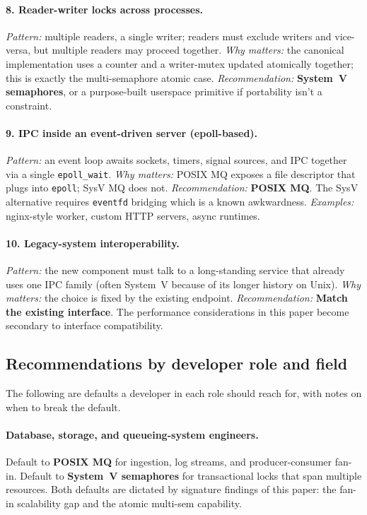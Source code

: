 \documentclass[a4paper,11pt]{article}
\begin{document}
\paragraph{8. Reader-writer locks across processes.}
\textit{Pattern:} multiple readers, a single writer; readers must
exclude writers and vice-versa, but multiple readers may proceed
together.\quad
\textit{Why matters:} the canonical implementation uses a counter
and a writer-mutex updated atomically together; this is exactly the
multi-semaphore atomic case.\quad
\textit{Recommendation:} \textbf{System~V semaphores}, or a
purpose-built userspace primitive if portability isn't a constraint.

\paragraph{9. IPC inside an event-driven server (epoll-based).}
\textit{Pattern:} an event loop awaits sockets, timers, signal
sources, and IPC together via a single \texttt{epoll\_wait}.\quad
\textit{Why matters:} POSIX MQ exposes a file descriptor that
plugs into \texttt{epoll}; SysV MQ does not.\quad
\textit{Recommendation:} \textbf{POSIX MQ}. The SysV alternative
requires \texttt{eventfd} bridging which is a known awkwardness.\quad
\textit{Examples:} nginx-style worker, custom HTTP servers, async
runtimes.

\paragraph{10. Legacy-system interoperability.}
\textit{Pattern:} the new component must talk to a long-standing
service that already uses one IPC family (often System~V because of
its longer history on Unix).\quad
\textit{Why matters:} the choice is fixed by the existing endpoint.\quad
\textit{Recommendation:} \textbf{Match the existing interface}. The
performance considerations in this paper become secondary to
interface compatibility.

\subsection{Recommendations by developer role and field}
\label{sec:guidance:role}

The following are defaults a developer in each role should reach
for, with notes on when to break the default.

\paragraph{Database, storage, and queueing-system engineers.}
Default to \textbf{POSIX MQ} for ingestion, log streams, and
producer-consumer fan-in. Default to \textbf{System~V semaphores}
for transactional locks that span multiple resources. Both
defaults are dictated by signature findings of this paper: the
fan-in scalability gap and the atomic multi-sem capability.
\end{document}

